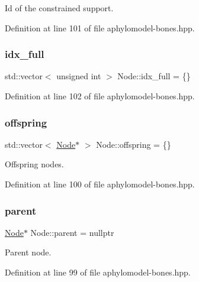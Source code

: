 Id of the constrained support. 



Definition at line 101 of file aphylomodel-\/bones.\+hpp.

\mbox{\label{class_node_a33e1dede84aea9685dfad5c0b3baeea7}} 
\subsubsection{\texorpdfstring{idx\+\_\+full}{idx\_full}}
{\footnotesize\ttfamily std\+::vector$<$ unsigned int $>$ Node\+::idx\+\_\+full = \{\}}



Definition at line 102 of file aphylomodel-\/bones.\+hpp.

\mbox{\label{class_node_a4e7e9c69da2575cad9c5fb7865dd42c7}} 
\subsubsection{\texorpdfstring{offspring}{offspring}}
{\footnotesize\ttfamily std\+::vector$<$ \hyperlink{class_node}{Node}$\ast$ $>$ Node\+::offspring = \{\}}



Offspring nodes. 



Definition at line 100 of file aphylomodel-\/bones.\+hpp.

\mbox{\label{class_node_ad8184598cdea70e4bbdfd76f2b0f9e85}} 
\subsubsection{\texorpdfstring{parent}{parent}}
{\footnotesize\ttfamily \hyperlink{class_node}{Node}$\ast$ Node\+::parent = nullptr}



Parent node. 



Definition at line 99 of file aphylomodel-\/bones.\+hpp.

\mbox{\label{class_node_a479513290e6e83b8715f3075dd289ff4}} 
